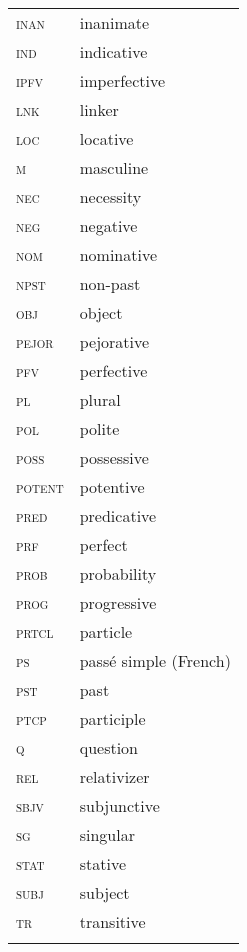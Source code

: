 \begin{tabularx}{.45\textwidth}{>{\scshape}lQ} 
inan & inanimate\\
ind & indicative\\
ipfv & imperfective\\
lnk & linker\\
loc & locative\\
m & masculine\\
nec & necessity\\
neg & negative\\
nom & nominative\\
npst & non-past\\
obj & object\\
pejor & pejorative\\
pfv & perfective\\
pl & plural\\
pol & polite\\
poss & possessive\\
potent & potentive\\
pred & predicative\\
prf & perfect\\
prob & probability\\
prog & progressive\\
prtcl & particle\\
ps & passé simple (French)\\
pst & past\\
ptcp & participle\\
q & question\\
rel & relativizer\\
sbjv & subjunctive\\
sg & singular\\
stat & stative\\
subj & subject\\
tr & transitive\\
\\
\end{tabularx}


 

